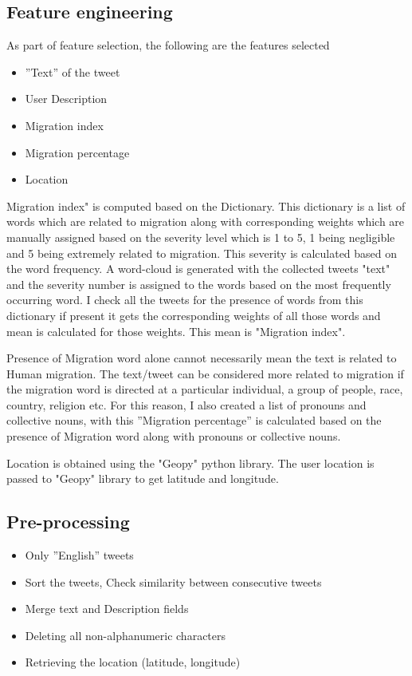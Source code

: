 \subsection{Feature engineering}
As part of feature selection, the following are the features selected
\begin{itemize}
  \item ”Text” of the tweet
  \item  User Description
  \item  Migration index
  \item  Migration percentage
  \item  Location
\end{itemize}
 Migration index" is computed based on the Dictionary. This dictionary is a list of words which are related to migration along with corresponding weights which are manually assigned based on the severity level which is 1 to 5, 1 being negligible and 5 being extremely related to migration. This severity is calculated based on the word frequency. A word-cloud is generated with the collected tweets "text" and the severity number is assigned to the words based on the most frequently occurring word.
 I check all the tweets for the presence of words from this dictionary if present it gets the corresponding weights of all those words and mean is calculated for those weights. This mean is "Migration index". 
 


Presence of Migration word alone cannot necessarily mean the text is related
to Human migration. The text/tweet can be considered more related to migration if the migration word is directed at a particular individual, a group of
people, race, country, religion etc. For this reason, I also created a list of pronouns and collective nouns, with this ”Migration percentage” is calculated based on the presence of Migration word along with pronouns or collective nouns.   

Location is obtained using the "Geopy" python library. The user location is passed to "Geopy" library to get latitude and longitude. 


\subsection{Pre-processing}

\begin{itemize}
  \item Only ”English” tweets
  \item Sort the tweets, Check similarity between consecutive tweets
  \item Merge text and Description fields
  \item Deleting all non-alphanumeric characters
  \item Retrieving the location (latitude, longitude)
\end{itemize}

